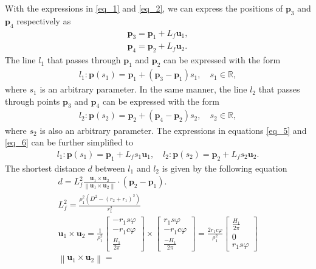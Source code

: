 \documentclass[12pt,letterpaper]{article}
\newcommand{\mb}[1]{\mathbf{#1}}
\newcommand{\norm}[1]{\left\lVert#1\right\rVert}
\begin{document}
With the expressions in \eqref{eq_1} and \eqref{eq_2}, we can express the positions of $\mathbf{p}_3$ and $\mathbf{p}_4$ respectively as 
\begin{align}
\mathbf{p}_3 = \mathbf{p}_1 + L_f\mathbf{u}_1,\\ \mathbf{p}_4 = \mathbf{p}_2 + L_f\mathbf{u}_2.
\end{align}
The line $l_1$ that passes through $\mathbf{p}_1$ and $\mathbf{p}_2$ can be expressed with the form
\begin{align}
l_1: \mathbf{p}(s_1) = \mathbf{p}_1 + (\mathbf{p}_3-\mb{p}_1)s_1, \quad s_1 \in \mathbb{R},\label{eq_5}
\end{align}
where $s_1$ is an arbitrary parameter.
In the same manner, the line $l_2$ that passes through points $\mb{p}_3$ and $\mb{p}_4$ can be expressed with the form \begin{align}
l_2: \mathbf{p}(s_2) = \mathbf{p}_2 + (\mathbf{p}_4-\mb{p}_2)s_2, \quad s_2 \in \mathbb{R},\label{eq_6}
\end{align}
where $s_2$ is also an arbitrary parameter. The expressions in equations \eqref{eq_5} and \eqref{eq_6} can be further simplified to 
\begin{align}
l_1: \mb{p}(s_1) = \mb{p}_1 + L_fs_1\mb{u}_1, \quad l_2:\mb{p}(s_2) = \mb{p}_2 + L_fs_2\mb{u}_2.
\end{align}
The shortest distance $d$ between $l_1$ and $l_2$ is given by the following equation
\begin{align}
d =L_f^2\frac{\mb{u}_1\times\mb{u}_2}{\norm{\mb{u}_1\times\mb{u}_2}}\cdot\left(\mb{p}_2-\mb{p}_1\right). \\
L_f^2 = \frac{\rho^2_1\left(D^2-(r_2+r_1)^2\right)}{r_1^2}\\
\mb{u}_1\times\mb{u}_2 = \frac{1}{\rho_1^2}\begin{bmatrix}
-r_1s\varphi\\
-r_1c\varphi\\
\frac{H_1}{2\pi}
\end{bmatrix}\times
\begin{bmatrix}
r_1s\varphi\\
-r_1c\varphi\\
\frac{-H_1}{2\pi}
\end{bmatrix} = \frac{2r_1c\varphi}{\rho_1^2}\begin{bmatrix}
\frac{H_1}{2\pi}\\0\\r_1s\varphi
\end{bmatrix}\\
\norm{\mb{u}_1\times\mb{u}_2} = 
\end{align}
\end{document}
